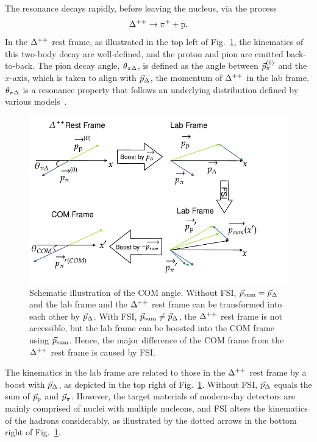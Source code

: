 The resonance decays rapidly, before leaving the nucleus, via the process
\begin{equation}
     \Delta^{++} \rightarrow \pi^+ + \textrm{p}.
\end{equation}
In the $\Delta^{++}$ rest frame, as illustrated in the top left of Fig.~\ref{fig:COM-diagram}, the kinematics of this two-body decay are well-defined, and the proton and pion are emitted back-to-back.
The pion decay angle, $\theta_{\pi\Delta}$, is defined as the angle between $\vec{p}_{\pi}^{(0)}$ and the $x$-axis, which is taken to align with $\vec{p}_{\Delta}$, the momentum of $\Delta^{++}$ in the lab frame. 
$\theta_{\pi\Delta}$ is a resonance property that follows an underlying distribution defined by various models~\cite{Rein:1987cb,Kabirnezhad:2017jmf,Kabirnezhad:2020wtp,Kabirnezhad:2022znc}.

\begin{figure}[ht!]
\centering
\includegraphics[width=\linewidth]{figures/COM/COM-diagram.pdf}
\caption{Schematic illustration of the COM angle. Without FSI, $\vec{p}_{\textrm{sum}}=\vec{p}_{\Delta}$ and the lab frame and the $\Delta^{++}$ rest frame can be transformed into each other by $\vec{p}_{\Delta}$. With FSI, $\vec{p}_{\textrm{sum}} \neq \vec{p}_{\Delta}$, the $\Delta^{++}$ rest frame is not accessible, but the lab frame can be boosted into the COM frame using $\vec{p}_{\textrm{sum}}$. Hence, the major difference of the COM frame from the $\Delta^{++}$ rest frame is caused by FSI.}
\label{fig:COM-diagram}
\end{figure}

The kinematics in the lab frame are related to those in the $\Delta^{++}$ rest frame by a boost with $\vec{p}_{\Delta}$, as depicted in the top right of Fig.~\ref{fig:COM-diagram}. 
Without FSI, $\vec{p}_{\Delta}$ equals the sum of $\vec{p}_\textrm{p}$ and $\vec{p}_{\pi}$.
However, the target materials of modern-day detectors are mainly comprised of nuclei with multiple nucleons, and FSI alters the kinematics of the hadrons considerably, as illustrated by the dotted arrows in the bottom right of Fig.~\ref{fig:COM-diagram}.

